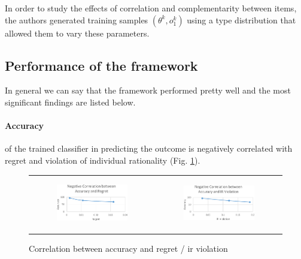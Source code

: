 \documentclass[]{article}
\begin{document}
\noindent In order to study the effects of correlation and complementarity between items, the authors generated training samples  $(\theta^{k}, o_{1}^{k})$ using a type distribution that allowed them to vary these parameters. 

\subsection{Performance of the framework}

In general we can say that the framework performed pretty well and the most significant findings are listed below.

\paragraph{Accuracy} of the trained classifier in predicting the outcome is negatively correlated with regret and violation of individual rationality (Fig. \ref{accuracyCorrelation}).

\begin{figure}[!ht]
	\begin{tabular}{c c}
		\begin{subfigure}{0.5\textwidth}
			
			\begin{center}
				\includegraphics[width=55mm]{res/negCorrelationRegret-cropped.pdf}
			\end{center}
			
		\end{subfigure} &
		\begin{subfigure}{0.5\textwidth}
			\includegraphics[width=55mm]{res/negCorrelationIR-cropped.pdf}
		\end{subfigure}
	\end{tabular}
	\caption{Correlation between accuracy and regret / ir violation}
	\label{accuracyCorrelation}
\end{figure}
\vspace{-5mm}
\end{document}
